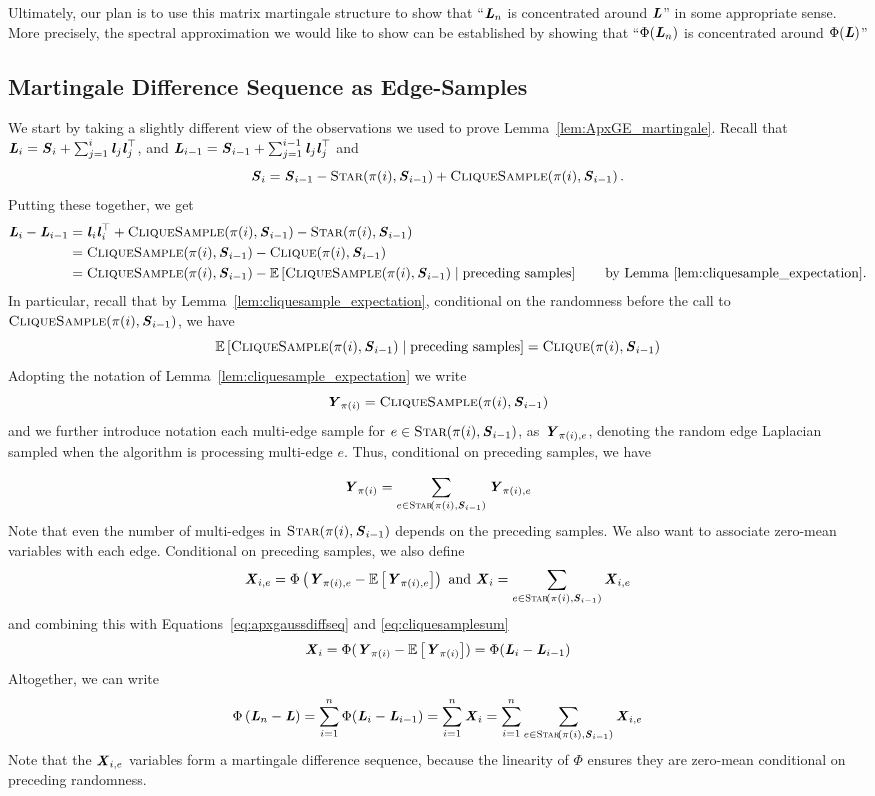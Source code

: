 Ultimately, our plan is to use this matrix martingale structure to show
that ``$\boldsymbol{\mathit{L}}_n$ is concentrated around $\boldsymbol{\mathit{L}}$'' in some appropriate
sense.
More precisely, the spectral approximation we would like to show can
be established by showing that  ``$\Phi(\boldsymbol{\mathit{L}}_n)$ is concentrated around $\Phi(\boldsymbol{\mathit{L}})$''

\subsection{Martingale Difference Sequence as Edge-Samples}
We start by taking a slightly different view of the observations we
used to prove Lemma~\ref{lem:ApxGE_martingale}.
Recall that $\boldsymbol{\mathit{L}}_i = \boldsymbol{\mathit{S}}_i + \sum_{j=1}^i \boldsymbol{\mathit{l}}_j\boldsymbol{\mathit{l}}_j^\top$,
and  $\boldsymbol{\mathit{L}}_{i-1} = \boldsymbol{\mathit{S}}_{i-1} + \sum_{j=1}^{i-1} \boldsymbol{\mathit{l}}_j\boldsymbol{\mathit{l}}_j^\top$
and
\[
  \boldsymbol{\mathit{S}}_{i} = \boldsymbol{\mathit{S}}_{i-1} - \textsc{Star}\!\left({\pi(i),\boldsymbol{\mathit{S}}_{i-1}}\right) +
  \textsc{CliqueSample}\!\left({\pi(i),\boldsymbol{\mathit{S}}_{i-1}}\right)
 . \]
Putting these together, we get
\begin{align}
  \LL_i - \LL_{i-1}
  &=
  \ll_i\ll_i^\trp
  +
  \vcliqsp{\pi(i)}{\SS_{i-1}}
  -
    \vstar{\pi(i)}{\SS_{i-1}}
     \nonumber
  \\
    \label{eq:apxgaussdiffseq}
  &=
  \vcliqsp{\pi(i)}{\SS_{i-1}}
  -
    \vcliq{\pi(i)}{\SS_{i-1}}
\\
  &=
  \vcliqsp{\pi(i)}{\SS_{i-1}}
  -
    \E{\vcliqsp{\pi(i)}{\SS_{i-1}} \mid \text{preceding samples}}
 \tag*{by Lemma~\ref{lem:cliquesample_expectation}.}
\end{align}
In particular, recall that by Lemma~\ref{lem:cliquesample_expectation},
conditional on the randomness before
the call to $\textsc{CliqueSample}\!\left({\pi(i),\boldsymbol{\mathit{S}}_{i-1}}\right)$, we
have
\[
\mathop{{}\mathbb{E}}\left[\textsc{CliqueSample}\!\left({\pi(i),\boldsymbol{\mathit{S}}_{i-1}}\right) \mid \text{preceding samples}\right]= \textsc{Clique}\!\left({\pi(i),\boldsymbol{\mathit{S}}_{i-1}}\right)
\]
Adopting the notation of Lemma~\ref{lem:cliquesample_expectation}
we write
\[
  \boldsymbol{\mathit{Y}}_{\pi(i)} = \textsc{CliqueSample}\!\left({\pi(i),\boldsymbol{\mathit{S}}_{i-1}}\right)
\]
and we further introduce notation each multi-edge sample for
$e \in \textsc{Star}\!\left({\pi(i),\boldsymbol{\mathit{S}}_{i-1}}\right)$, as $\boldsymbol{\mathit{Y}}_{\pi(i),e}$, denoting the random
edge Laplacian sampled when the algorithm is processing multi-edge
$e$.
Thus, conditional on preceding samples, we have

\begin{equation}
  \label{eq:cliquesamplesum}
  \boldsymbol{\mathit{Y}}_{\pi(i)} = \sum_{e \in
    \textsc{Star}\!\left({\pi(i),\boldsymbol{\mathit{S}}_{i-1}}\right)}\boldsymbol{\mathit{Y}}_{\pi(i),e}
\end{equation}
Note that even the number of multi-edges in
$\textsc{Star}\!\left({\pi(i),\boldsymbol{\mathit{S}}_{i-1}}\right)$ depends on the preceding samples.
We also want to associate zero-mean variables with each edge.
Conditional on preceding samples, we also define
\[
  \boldsymbol{\mathit{X}}_{i,e} = \Phi\left( \boldsymbol{\mathit{Y}}_{\pi(i),e} - \mathop{{}\mathbb{E}}\left[\boldsymbol{\mathit{Y}}_{\pi(i),e}\right] \right)
  \text{ and }
  \boldsymbol{\mathit{X}}_{i} = \sum_{e \in
    \textsc{Star}\!\left({\pi(i),\boldsymbol{\mathit{S}}_{i-1}}\right)}\boldsymbol{\mathit{X}}_{i,e}
\]
and combining this with Equations~\eqref{eq:apxgaussdiffseq} and \eqref{eq:cliquesamplesum}
\[
  \boldsymbol{\mathit{X}}_{i}
  = \Phi(\boldsymbol{\mathit{Y}}_{\pi(i)} - \mathop{{}\mathbb{E}}\left[\boldsymbol{\mathit{Y}}_{\pi(i)}\right])
  = \Phi(\boldsymbol{\mathit{L}}_i - \boldsymbol{\mathit{L}}_{i-1})
\]
Altogether, we can write
\[
  \Phi\left(  \boldsymbol{\mathit{L}}_n -\boldsymbol{\mathit{L}} \right)
  =
    \sum_{i=1}^n \Phi(\boldsymbol{\mathit{L}}_i - \boldsymbol{\mathit{L}}_{i-1})
  =
  \sum_{i=1}^n \boldsymbol{\mathit{X}}_i
  =
  \sum_{i=1}^n \sum_{e \in
    \textsc{Star}\!\left({\pi(i),\boldsymbol{\mathit{S}}_{i-1}}\right)}\boldsymbol{\mathit{X}}_{i,e}
\]
Note that the $\boldsymbol{\mathit{X}}_{i,e}$ variables form a martingale difference
sequence, because the linearity of $\Phi$ ensures they are zero-mean
conditional on preceding randomness.

